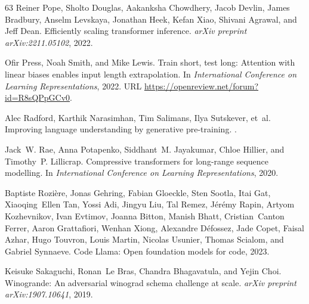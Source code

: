 \documentclass{article} \usepackage{iclr2024_conference,times}
\begin{document}
\begin{thebibliography}{63}
Reiner Pope, Sholto Douglas, Aakanksha Chowdhery, Jacob Devlin, James Bradbury,
  Anselm Levskaya, Jonathan Heek, Kefan Xiao, Shivani Agrawal, and Jeff Dean.
\newblock Efficiently scaling transformer inference.
\newblock \emph{arXiv preprint arXiv:2211.05102}, 2022.

Ofir Press, Noah Smith, and Mike Lewis.
\newblock Train short, test long: Attention with linear biases enables input
  length extrapolation.
\newblock In \emph{International Conference on Learning Representations}, 2022.
\newblock URL \url{https://openreview.net/forum?id=R8sQPpGCv0}.

Alec Radford, Karthik Narasimhan, Tim Salimans, Ilya Sutskever, et~al.
\newblock Improving language understanding by generative pre-training.
.

Jack~W. Rae, Anna Potapenko, Siddhant~M. Jayakumar, Chloe Hillier, and
  Timothy~P. Lillicrap.
\newblock Compressive transformers for long-range sequence modelling.
\newblock In \emph{International Conference on Learning Representations}, 2020.

Baptiste Rozière, Jonas Gehring, Fabian Gloeckle, Sten Sootla, Itai Gat,
  Xiaoqing~Ellen Tan, Yossi Adi, Jingyu Liu, Tal Remez, Jérémy Rapin, Artyom
  Kozhevnikov, Ivan Evtimov, Joanna Bitton, Manish Bhatt, Cristian~Canton
  Ferrer, Aaron Grattafiori, Wenhan Xiong, Alexandre Défossez, Jade Copet,
  Faisal Azhar, Hugo Touvron, Louis Martin, Nicolas Usunier, Thomas Scialom,
  and Gabriel Synnaeve.
\newblock Code {L}lama: Open foundation models for code, 2023.

Keisuke Sakaguchi, Ronan~Le Bras, Chandra Bhagavatula, and Yejin Choi.
\newblock Winogrande: An adversarial winograd schema challenge at scale.
\newblock \emph{arXiv preprint arXiv:1907.10641}, 2019.


\end{thebibliography}
\end{document}
